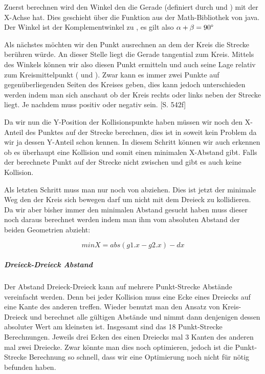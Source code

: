 
Zuerst berechnen wird den Winkel \textalpha den die Gerade (definiert durch  und ) mit der X-Achse hat. 
Dies geschieht über die Funktion  aus der Math-Bibliothek von java. 
Der Winkel \textbeta  ist der Komplementwinkel zu \textalpha, es gilt also $\alpha + \beta = 90\degree$


Als nächstes möchten wir den Punkt ausrechnen an dem der Kreis die Strecke berühren würde. An dieser Stelle liegt die Gerade tangential zum Kreis. Mittels des Winkels \textbeta  können wir also diesen Punkt ermitteln und auch seine Lage relativ zum Kreismittelpunkt ( und ).
Zwar kann es immer zwei Punkte auf gegenüberliegenden Seiten des Kreises geben, dies kann jedoch unterschieden werden indem man sich anschaut ob der Kreis rechts oder links neben der Strecke liegt. Je nachdem muss  positiv oder negativ sein. \cite{EMFGAIA}[S. 542f]


Da wir nun die Y-Position der Kollisionspunkte haben müssen wir noch den X-Anteil des Punktes auf der Strecke berechnen, dies ist in soweit kein Problem da wir ja dessen Y-Anteil schon kennen. In diesem Schritt können wir auch erkennen ob es überhaupt eine Kollision und somit einen minimalen X-Abstand gibt. Falls der berechnete Punkt auf der Strecke nicht zwischen  und  gibt es auch keine Kollision.


Als letzten Schritt muss man nur noch  von  abziehen. Dies ist jetzt der minimale Weg den der Kreis sich bewegen darf um nicht mit dem Dreieck zu kollidieren. Da wir aber bisher immer den minimalen Abstand gesucht haben muss dieser noch daraus berechnet werden indem man ihm vom absoluten Abstand der beiden Geometrien abzieht:

$$minX = abs(g1.x - g2.x) - dx$$

\subparagraph{Dreieck-Dreieck Abstand}

Der Abstand Dreieck-Dreieck kann auf mehrere Punkt-Strecke Abstände vereinfacht werden. Denn bei jeder Kollision muss eine Ecke eines Dreiecks auf eine Kante des anderen treffen. Wieder benutzt man den Ansatz von Kreis-Dreieck und berechnet alle gültigen Abstände und nimmt dann denjenigen dessen absoluter Wert am kleinsten ist. Insgesamt sind das 18 Punkt-Strecke Berechnungen. Jeweils drei Ecken des einen Dreiecks mal 3 Kanten des anderen mal zwei Dreiecke. Zwar könnte man dies noch optimieren, jedoch ist die Punkt-Strecke Berechnung so schnell, dass wir eine Optimierung noch nicht für nötig befunden haben.

